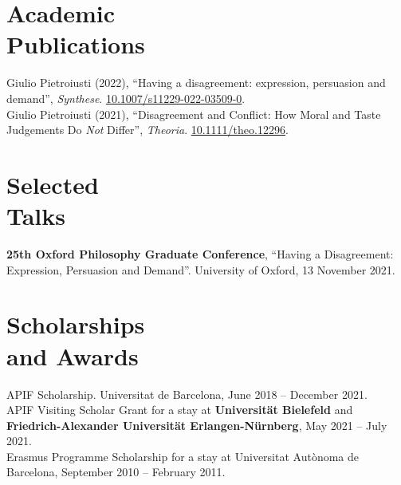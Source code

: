\documentclass[margin,line]{resume}
\begin{document}
\begin{resume}
    \section{\mysidestyle Academic \\Publications}

    Giulio Pietroiusti (2022), ``Having a disagreement: expression,
    persuasion and demand'', \textsl{Synthese}.
    \href{https://doi.org/10.1007/s11229-022-03509-0}{10.1007/s11229-022-03509-0}.\vspace{1mm}\\%
    Giulio Pietroiusti (2021), ``Disagreement and Conflict: How Moral
    and Taste Judgements Do \textit{Not} Differ'', \textsl{Theoria}.
    \href{https://doi.org/10.1111/theo.12296}{10.1111/theo.12296}.\vspace{-2mm}%

    \section{\mysidestyle Selected\\Talks}
    \textbf{25th Oxford Philosophy Graduate Conference}, ``Having a
    Disagreement: Expression, Persuasion and Demand''. University of
    Oxford, 13 November 2021.\vspace{-2mm}%

    \section{\mysidestyle Scholarships\\and Awards}
    APIF Scholarship. Universitat de Barcelona, June 2018 -- December 2021.\vspace{1mm}\\%
    APIF Visiting Scholar Grant for a stay at \textbf{Universität Bielefeld} and \textbf{Friedrich-Alexander Universität Erlangen-Nürnberg}, May 2021 -- July 2021.\vspace{1mm}\\%
    Erasmus Programme Scholarship for a stay at Universitat Autònoma de Barcelona, September 2010 -- February 2011.\vspace{-2mm}%


\end{resume}
\end{document}
